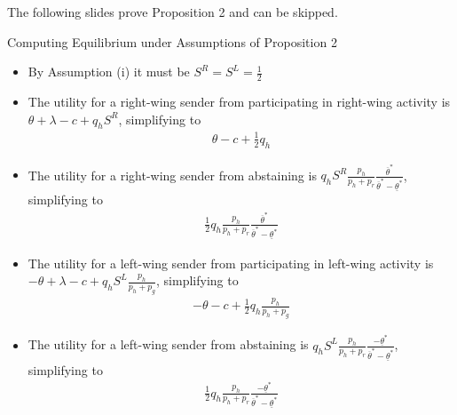 \documentclass[9pt,aspectratio=1610]{beamer}
\begin{document}
\begin{frame}
The following slides prove Proposition 2 and can be skipped.
\end{frame}


\begin{frame}{Computing Equilibrium under Assumptions of Proposition 2}
\begin{itemize}
    \item By Assumption (i) it must be $S^R = S^L=\frac{1}{2}$
    \item The utility for a right-wing sender from participating in right-wing activity is $\theta + \lambda - c + q_h S^R$, simplifying to
    \begin{align*}
         \theta - c + \frac{1}{2}q_h
    \end{align*}
    \item The utility for a right-wing sender from abstaining is $q_hS^R\frac{p_h}{p_h+p_r}\frac{\overline{\theta}^*}{\overline{\theta}^* - \underline{\theta}^*}$, simplifying to
    \begin{align*}
         \frac{1}{2}q_h\frac{p_h}{p_h+p_r}\frac{\overline{\theta}^*}{\overline{\theta}^* - \underline{\theta}^*}
    \end{align*}
    \item The utility for a left-wing sender from participating in left-wing activity is $-\theta + \lambda - c + q_h S^L\frac{p_h}{p_h+p_g}$, simplifying to
    \begin{align*}
        -\theta - c + \frac{1}{2}q_h \frac{p_h}{p_h+p_g}
    \end{align*}
    \item The utility for a left-wing sender from abstaining is $q_h S^L\frac{p_h}{p_h+p_r}\frac{-\underline{\theta}^*}{\overline{\theta}^* - \underline{\theta}^*}$, simplifying to
    \begin{align*}
         \frac{1}{2}q_h\frac{p_h}{p_h+p_r}\frac{-\underline{\theta}^*}{\overline{\theta}^* - \underline{\theta}^*}
    \end{align*}
\end{itemize}
\end{frame}
\end{document}
